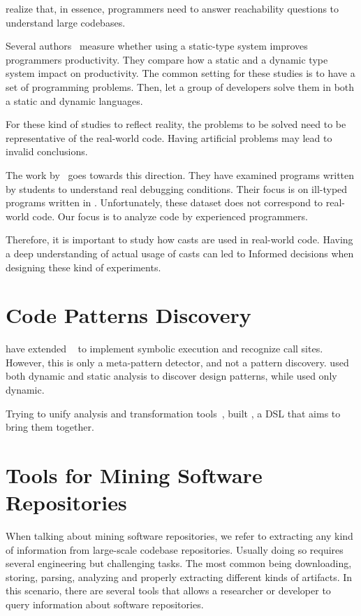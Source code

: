 \documentclass{usiinfdocprop}
\begin{document}
\cite{latoza_developers_2010} realize that, in essence, programmers need to answer reachability questions to understand large codebases.

Several authors~\cite{stuchlik_static_2011,mayer_empirical_2012,harlin_impact_2017} measure whether using a static-type system improves programmers productivity.
They compare how a static and a dynamic type system impact on productivity.
The common setting for these studies is to have a set of programming problems.
Then, let a group of developers solve them in both a static and dynamic languages.

For these kind of studies to reflect reality, the problems to be solved need to be representative of the real-world code.
Having artificial problems may lead to invalid conclusions.

The work by~\cite{wu_how_2017,wu_learning_2017} goes towards this direction.
They have examined programs written by students to understand real debugging conditions.
Their focus is on ill-typed programs written in \haskell{}.
Unfortunately, these dataset does not correspond to real-world code.
Our focus is to analyze code by experienced programmers.

Therefore, it is important to study how casts are used in real-world code.
Having a deep understanding of actual usage of casts can led to
Informed decisions when designing these kind of experiments.

\section{Code Patterns Discovery \label{org1f4d4e8}}
\label{sec:org3b7cfce}
\cite{posnett_thex:_2010} have extended \asm{}~\cite{bruneton_asm:_2002,kuleshov_using_2007} to implement symbolic execution and recognize call sites.
However, this is only a meta-pattern detector, and not a pattern discovery.
\cite{hu_dynamic_2008} used both dynamic and static analysis to discover design patterns, while \cite{arcelli_design_2008} used only dynamic.

Trying to unify analysis and transformation tools~\cite{vinju_how_2006}, \cite{klint_rascal:_2009} built \rascal, a DSL that aims to bring them together. 

\section{Tools for Mining Software Repositories \label{org9efd57b}}
\label{sec:org28660c9}
When talking about mining software repositories, we refer to extracting any kind of information from large-scale codebase repositories.
Usually doing so requires several engineering but challenging tasks.
The most common being downloading, storing, parsing, analyzing and properly extracting different kinds of artifacts.
In this scenario, there are several tools that allows a researcher or developer to query information about software repositories.
\end{document}

